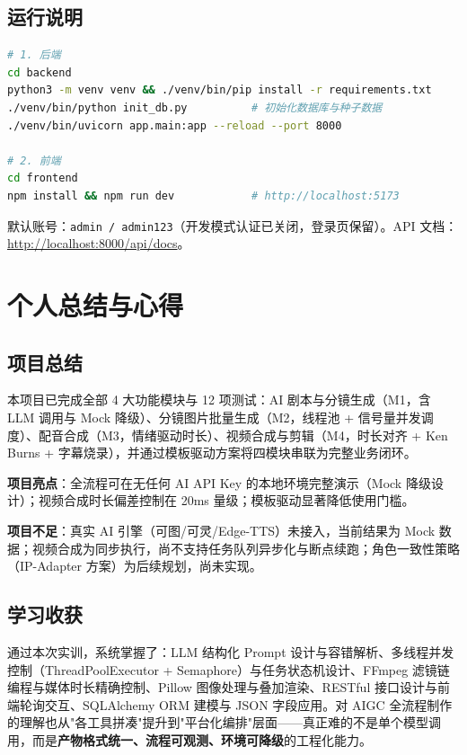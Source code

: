\documentclass[12pt]{ctexrep}
\begin{document}
\section{运行说明}

\begin{lstlisting}[language=bash,caption={项目运行步骤},label=lst:run]
# 1. 后端
cd backend
python3 -m venv venv && ./venv/bin/pip install -r requirements.txt
./venv/bin/python init_db.py          # 初始化数据库与种子数据
./venv/bin/uvicorn app.main:app --reload --port 8000

# 2. 前端
cd frontend
npm install && npm run dev            # http://localhost:5173
\end{lstlisting}

默认账号：\texttt{admin / admin123}（开发模式认证已关闭，登录页保留）。API 文档：\url{http://localhost:8000/api/docs}。

\chapter{个人总结与心得}
\section{项目总结}

本项目已完成全部 4 大功能模块与 12 项测试：AI 剧本与分镜生成（M1，含 LLM 调用与 Mock 降级）、分镜图片批量生成（M2，线程池 + 信号量并发调度）、配音合成（M3，情绪驱动时长）、视频合成与剪辑（M4，时长对齐 + Ken Burns + 字幕烧录），并通过模板驱动方案将四模块串联为完整业务闭环。

\textbf{项目亮点}：全流程可在无任何 AI API Key 的本地环境完整演示（Mock 降级设计）；视频合成时长偏差控制在 20ms 量级；模板驱动显著降低使用门槛。

\textbf{项目不足}：真实 AI 引擎（可图/可灵/Edge-TTS）未接入，当前结果为 Mock 数据；视频合成为同步执行，尚不支持任务队列异步化与断点续跑；角色一致性策略（IP-Adapter 方案）为后续规划，尚未实现。

\section{学习收获}

通过本次实训，系统掌握了：LLM 结构化 Prompt 设计与容错解析、多线程并发控制（ThreadPoolExecutor + Semaphore）与任务状态机设计、FFmpeg 滤镜链编程与媒体时长精确控制、Pillow 图像处理与叠加渲染、RESTful 接口设计与前端轮询交互、SQLAlchemy ORM 建模与 JSON 字段应用。对 AIGC 全流程制作的理解也从"各工具拼凑"提升到"平台化编排"层面——真正难的不是单个模型调用，而是\textbf{产物格式统一、流程可观测、环境可降级}的工程化能力。
\end{document}
